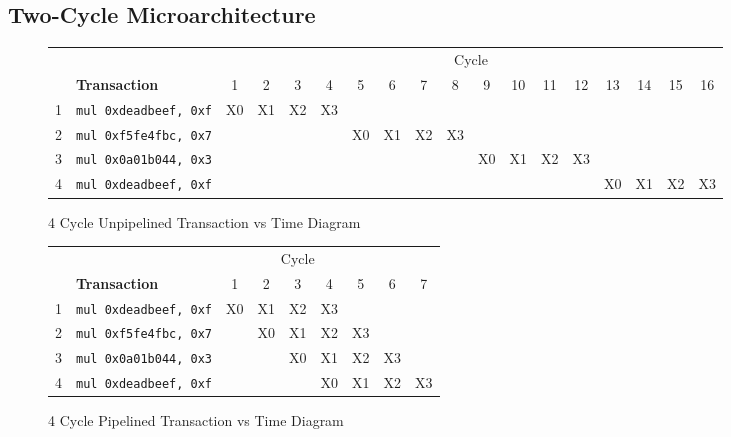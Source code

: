 \documentclass[10pt]{article}
\begin{document}
\subsection{Two-Cycle Microarchitecture}
\begin{figure}[H]
\centering
\begin{tabular}{cl|c|c|c|c|c|c|c|c|c|c|c|c|c|c|c|c}
\hline
& & \multicolumn{16}{c}{Cycle} \\
& \textbf{Transaction} & 1 & 2 & 3 & 4 & 5 & 6 & 7 & 8 & 9 & 10 & 11 & 12 & 13 & 14 & 15 & 16\\
\hline
1 & \texttt{mul 0xdeadbeef, 0xf} & X0 & X1 & X2 & X3 & & & & & & & & & & & &\\
\hline
2 & \texttt{mul 0xf5fe4fbc, 0x7} & & & & & X0 & X1 & X2 & X3 & & & & & & & &\\
\hline
3 & \texttt{mul 0x0a01b044, 0x3} & & & & & & & & & X0 & X1 & X2 & X3 & & & &\\
\hline
4 & \texttt{mul 0xdeadbeef, 0xf} & & & & & & & & & & & & & X0 & X1 & X2 & X3\\
\hline
\end{tabular}
\caption{4 Cycle Unpipelined Transaction vs Time Diagram}
\label{fig:4cycunpipe_trans_diagram}
\end{figure}
\begin{figure}[H]
\centering
\begin{tabular}{cl|c|c|c|c|c|c|c}
\hline
& & \multicolumn{5}{c}{Cycle} \\
& \textbf{Transaction} & 1 & 2 & 3 & 4 & 5 & 6 & 7 \\
\hline
1 & \texttt{mul 0xdeadbeef, 0xf} & X0 & X1 & X2 & X3 & & & \\
\hline
2 & \texttt{mul 0xf5fe4fbc, 0x7} & & X0 & X1 & X2 & X3 & & \\
\hline
3 & \texttt{mul 0x0a01b044, 0x3} & & & X0 & X1 & X2 & X3 & \\
\hline
4 & \texttt{mul 0xdeadbeef, 0xf} & & & & X0 & X1 & X2 & X3 \\
\hline
\end{tabular}
\caption{4 Cycle Pipelined Transaction vs Time Diagram}
\label{fig:4cycpipe_trans_diagram}
\end{figure}
\end{document}
